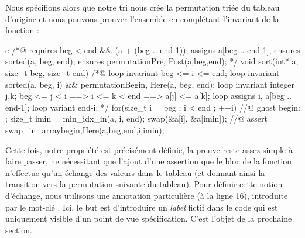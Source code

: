 Nous spécifions alors que notre tri nous crée la permutation triée du tableau
d'origine et nous pouvons prouver l'ensemble en complétant l'invariant de la
fonction :



\begin{CodeBlock}{c}
/*@
  requires beg < end && \valid(a + (beg .. end-1));
  assigns  a[beg .. end-1];  
  ensures sorted(a, beg, end);
  ensures permutation{Pre, Post}(a,beg,end);
*/
void sort(int* a, size_t beg, size_t end){
  /*@
    loop invariant beg <= i <= end;
    loop invariant sorted(a, beg, i) && permutation{Begin, Here}(a, beg, end);
    loop invariant \forall integer j,k; beg <= j < i ==> i <= k < end ==> a[j] <= a[k];
    loop assigns i, a[beg .. end-1];
    loop variant end-i;
  */
  for(size_t i = beg ; i < end ; ++i){
    //@ ghost begin: ;
    size_t imin = min_idx_in(a, i, end);
    swap(&a[i], &a[imin]);
    //@ assert swap_in_array{begin,Here}(a,beg,end,i,imin);
  }
}
\end{CodeBlock}



Cette fois, notre propriété est précisément définie, la preuve reste assez
simple à faire passer, ne nécessitant que l'ajout d'une assertion que le bloc
de la fonction n'effectue qu'un échange des valeurs dans le tableau (et donnant
ainsi la transition vers la permutation suivante du tableau). Pour définir cette
notion d'échange, nous utilisons une annotation particulière (à la ligne 16),
introduite par le mot-clé . Ici, le but est d'introduire un \textit{label} 
fictif dans le code qui est uniquement visible d'un point de vue spécification.
C'est l'objet de la prochaine section.
